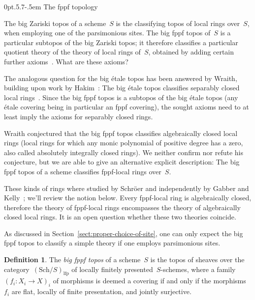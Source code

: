 \documentclass[10pt,reqno,a4paper]{amsbook}
\makeatletter
\theoremstyle{definition}
\newtheorem{defn}{Definition}[section]
\theoremstyle{plain}
\theoremstyle{remark}
\newcommand{\Sch}{\mathrm{Sch}}
\newcommand{\lfp}{\mathrm{lfp}}
\newcommand{\?}{\,{:}\,}
\renewcommand{\_}{\mathpunct{.}\,}
\def\subsection{\@startsection{subsection}{2}%
  {0pt}{.5\linespacing\@plus.7\linespacing}{-.5em}%
  {\normalfont\bfseries}}
\makeatother
\begin{document}
\subsection{The fppf topology}

The big Zariski topos of a scheme~$S$ is the classifying topos of local rings
over~$S$, when employing one of the parsimonious sites. The big fppf topos
of~$S$ is a particular subtopos of the big Zariski topos; it therefore
classifies a particular quotient theory of the theory of local rings of~$S$,
obtained by adding certain further axioms~\cite{caramello:lattices}. What are
these axioms?

The analogous question for the big étale topos has been answered by Wraith,
building upon work by Hakim~\cite{hakim:relative-schemes}: The big étale topos
classifies separably closed local rings~\cite{wraith:generic-galois-theory}.
Since the big fppf topos is a subtopos of the big étale topos (any étale
covering being in particular an fppf covering), the sought axioms need to at
least imply the axioms for separably closed rings.

Wraith conjectured that the big fppf topos classifies algebraically closed
local rings (local rings for which any monic polynomial of positive degree has
a zero, also called absolutely integrally closed rings). We neither confirm nor
refute his conjecture, but we are able to give an alternative explicit
description: The big fppf topos of a scheme classifies fppf-local rings
over~$S$.

These kinds of rings where studied by Schröer and independently by Gabber and
Kelly~\cite{schroer:points-fppf,gabber:kelly:points}; we'll review the notion
below. Every fppf-local ring is algebraically closed, therefore the theory of
fppf-local rings encompasses the theory of algebraically closed local rings. It
is an open question whether these two theories coincide.

As discussed in Section~\ref{sect:proper-choice-of-site}, one can only expect
the big fppf topos to classify a simple theory if one employs parsimonious
sites.

\begin{defn}The \emph{big fppf topos} of a scheme~$S$ is the topos of sheaves
over the category~$(\Sch/S)_\lfp$ of locally finitely presented~$S$-schemes, where a
family~$(f_i : X_i \to X)_i$ of morphisms is deemed a covering if and only if
the morphisms~$f_i$ are flat, locally of finite presentation, and jointly surjective.\end{defn}
\end{document}
